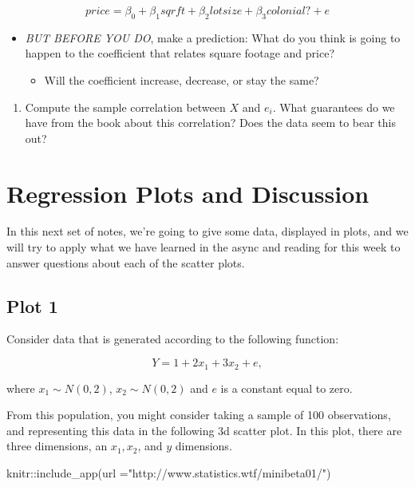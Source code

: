\documentclass[
  letterpaper,
  DIV=11,
  numbers=noendperiod]{scrreprt}
\newenvironment{Shaded}{\begin{snugshade}}{\end{snugshade}}
\newcommand{\AttributeTok}[1]{\textcolor[rgb]{0.40,0.45,0.13}{#1}}
\newcommand{\FunctionTok}[1]{\textcolor[rgb]{0.28,0.35,0.67}{#1}}
\newcommand{\NormalTok}[1]{\textcolor[rgb]{0.00,0.23,0.31}{#1}}
\newcommand{\SpecialCharTok}[1]{\textcolor[rgb]{0.37,0.37,0.37}{#1}}
\newcommand{\StringTok}[1]{\textcolor[rgb]{0.13,0.47,0.30}{#1}}
\providecommand{\tightlist}{%
  \setlength{\itemsep}{0pt}\setlength{\parskip}{0pt}}\usepackage{longtable,booktabs,array}
\begin{document}
\[
price = \beta_{0} + \beta_{1} sqrft + \beta_{2} lotsize + \beta_{3} colonial? + e
\]

\begin{itemize}
\tightlist
\item
  \emph{BUT BEFORE YOU DO}, make a prediction: What do you think is
  going to happen to the coefficient that relates square footage and
  price?

  \begin{itemize}
  \tightlist
  \item
    Will the coefficient increase, decrease, or stay the same?
  \end{itemize}
\end{itemize}

\begin{enumerate}
\def\labelenumi{\arabic{enumi}.}
\setcounter{enumi}{6}
\tightlist
\item
  Compute the sample correlation between \(X\) and \(e_i\). What
  guarantees do we have from the book about this correlation? Does the
  data seem to bear this out?
\end{enumerate}

\section{Regression Plots and
Discussion}\label{regression-plots-and-discussion}

In this next set of notes, we're going to give some data, displayed in
plots, and we will try to apply what we have learned in the async and
reading for this week to answer questions about each of the scatter
plots.

\subsection{Plot 1}\label{plot-1}

Consider data that is generated according to the following function:

\[
  Y = 1 + 2x_1 + 3x_2 + e, 
\]

where \(x_1 \sim N(0,2)\), \(x_2 \sim N(0,2)\) and \(e\) is a constant
equal to zero.

From this population, you might consider taking a sample of 100
observations, and representing this data in the following 3d scatter
plot. In this plot, there are three dimensions, an \(x_1, x_2\), and
\(y\) dimensions.

\begin{Shaded}
\begin{Highlighting}[]
\NormalTok{knitr}\SpecialCharTok{::}\FunctionTok{include\_app}\NormalTok{(}\AttributeTok{url =}\StringTok{"http://www.statistics.wtf/minibeta01/"}\NormalTok{)}
\end{Highlighting}
\end{Shaded}
\end{document}
